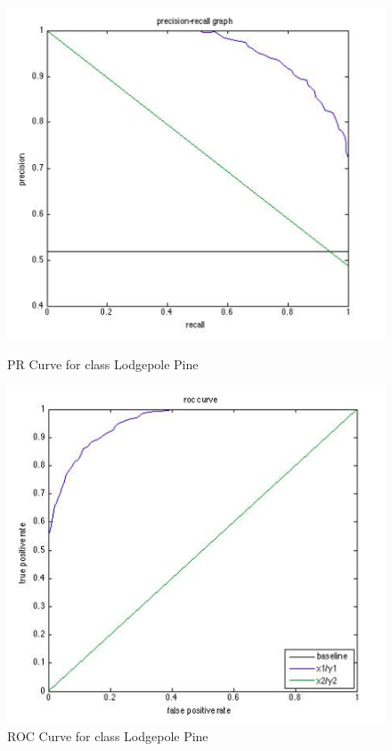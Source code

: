 \documentclass[11pt]{article}
\begin{document}
\begin{figure}[htbp]
\begin{minipage}[b]{0.5\linewidth}
\centering
\includegraphics[width=\linewidth]{LodgepolePinePRCurve.png}
\caption{PR Curve for class Lodgepole Pine}
\label{fig:chapter001_dist_001}
\end{minipage}
\hspace{0.5cm}
\begin{minipage}[b]{0.5\linewidth}
\centering
\includegraphics[width=\linewidth]{LodgepolePineROCCurve.png}
\caption{ROC Curve for class Lodgepole Pine}
\label{fig:chapter001_reward_001}
\end{minipage}
\end{figure}
\end{document}
